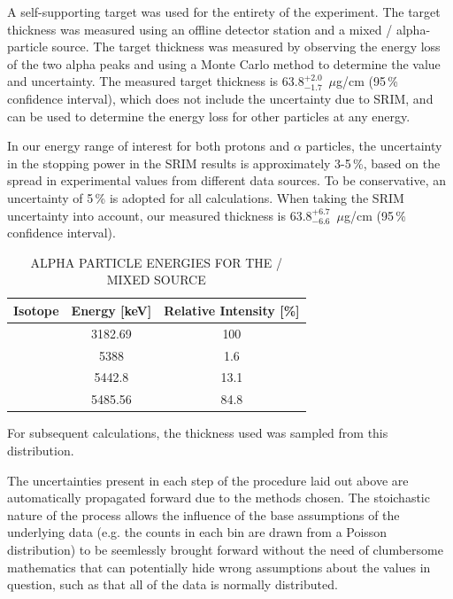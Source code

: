 A self-supporting  target was used for the entirety of the
experiment. The target thickness was measured using an offline detector
station and a mixed / alpha-particle source. The
target thickness was measured by observing the energy loss of the two
alpha peaks and using a Monte Carlo method to determine the value and
uncertainty. The measured target thickness is
$63.8^{+2.0}_{-1.7}$~$\mu$g/cm\squared{} (95\,\% confidence interval), which does
not include the uncertainty due to SRIM, and can be used to determine the
energy loss for other particles at any energy.

In our energy range of interest for both protons and $\alpha$ particles, the
uncertainty in the stopping power in the SRIM results is approximately 3-5\,\%,
based on the spread in experimental values from different data sources. To be
conservative, an uncertainty of 5\,\% is adopted for all calculations. When
taking the SRIM uncertainty into account, our measured thickness is
$63.8^{+6.7}_{-6.6}$~$\mu$g/cm\squared{} (95\,\% confidence interval).


\begin{table}
    \begin{center}
        \caption{ALPHA PARTICLE ENERGIES FOR THE /
            MIXED SOURCE}
        \label{tab:mixed-source}
        \begin{tabular}{rS[table-format=2.4]S[table-format=2.4]}
            \toprule
            \midrule
            {\textbf{Isotope}} & {\textbf{Energy [keV]}} &
                {\textbf{Relative Intensity [\%]}} \\
            \midrule
             & 3182.69 & 100   \\
             & 5388    &   1.6 \\
                          & 5442.8  &  13.1 \\
                          & 5485.56 &  84.8 \\
            \bottomrule
        \end{tabular}
    \end{center}
\end{table}

For subsequent calculations, the
thickness used was sampled from this distribution.

The uncertainties present in each step of the procedure laid out above
are automatically propagated forward due to the methods chosen. The
stoichastic nature of the process allows the influence of the base
assumptions of the underlying data (e.g. the counts in each bin are
drawn from a Poisson distribution) to be seemlessly brought forward
without the need of clumbersome mathematics that can potentially hide
wrong assumptions about the values in question, such as that all of the
data is normally distributed.

